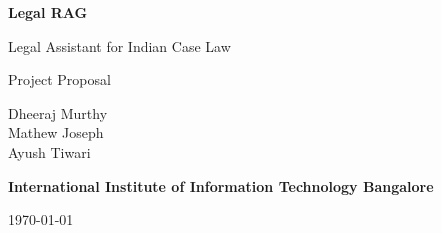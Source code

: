 \documentclass[11pt,a4paper]{article}
\begin{document}
\begin{titlepage}
\centering
\vspace*{2cm}

{\Huge\bfseries Legal RAG\par}
\vspace{0.4cm}
{\Large Legal Assistant for Indian Case Law\par}

\vspace{2cm}
{\Large Project Proposal\par}

\vspace{2cm}

Dheeraj Murthy\\
Mathew Joseph\\
Ayush Tiwari

\vfill

\textbf{International Institute of Information Technology Bangalore}

\vspace{0.5cm}
\today
\end{titlepage}


\begin{abstract}
India's legal ecosystem produces massive volumes of judgments that are
difficult to search manually. Existing legal research tools are expensive
and not optimized for Indian legal language. We present a
Retrieval-Augmented Generation system that ingests 26,000+ Supreme Court
judgment PDFs, indexes them as dense vector embeddings in PostgreSQL with
pgvector, and answers legal queries using a two-stage retrieval pipeline
followed by local LLM inference. The architecture combines BGE dense
embeddings, cross-encoder reranking, and Qwen2.5-7B-Instruct to deliver
grounded, citation-anchored answers without external API calls.
\end{abstract}

\vspace{0.3cm}
\noindent
{}
\end{document}
